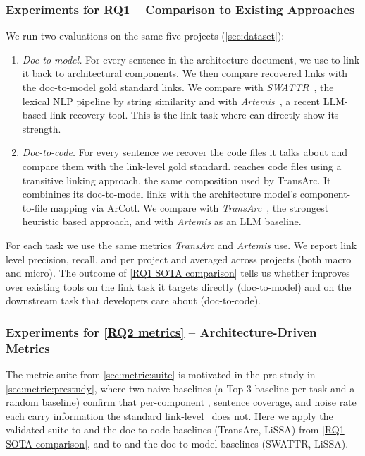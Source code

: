 \subsubsection{Experiments for RQ1 -- Comparison to Existing Approaches}
\label{sec:exp:rq1}

We run two evaluations on the same five projects (\autoref{sec:dataset}):
\begin{enumerate}[leftmargin=*]
    \item \emph{Doc-to-model.} For every sentence in the architecture document, we use \approach to link it back to architectural components.
     We then compare recovered links with the doc-to-model gold standard links. 
    We compare \approach{} with \emph{SWATTR}~\cite{keim_trace_2021}, the lexical NLP pipeline by string similarity and with \emph{Artemis}~\cite{fuchs_whos_2025}, a recent \ac{LLM}-based link recovery tool. 
    This is the link task where \approach{} can directly show its strength. 
    \item \emph{Doc-to-code.} For every sentence we recover the code files it talks about and compare them with the link-level gold standard. 
    \approach{} reaches code files using a transitive linking approach, the same composition used by TransArc.
    It combinines its doc-to-model links with the architecture model's component-to-file mapping via ArCotl\cite{keim_recovering_2024}. 
    We compare \approach{} with \emph{TransArc}~\cite{keim_recovering_2024}, the strongest heuristic based approach, 
    and with \emph{Artemis} as an \ac{LLM} baseline. %
\end{enumerate}
For each task we use the same metrics \emph{TransArc} and \emph{Artemis} use. 
We report link level precision, recall, and \fone per project and averaged across projects (both macro and micro).
The outcome of \ref{RQ1 SOTA comparison} tells us whether \approach{} improves over existing tools on the link task it targets directly (doc-to-model) and on the downstream task that developers care about (doc-to-code).


\subsubsection{Experiments for \ref{RQ2 metrics} -- Architecture-Driven Metrics}
\label{sec:exp:rq2}

The metric suite from \autoref{sec:metric:suite} is motivated in the pre-study in \autoref{sec:metric:prestudy},
where two naive baselines (a Top-3 baseline per task and a random baseline) confirm that per-component \fone, sentence coverage, and noise rate each carry information the standard link-level \fone\ does not.
Here we apply the validated suite to \approach{} and the doc-to-code baselines (TransArc, LiSSA) from \ref{RQ1 SOTA comparison}, and to \approach{} and the doc-to-model baselines (SWATTR, LiSSA).

